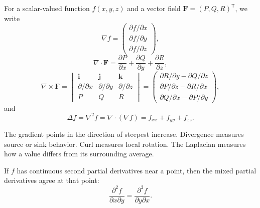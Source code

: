     \begin{definition}
        For a scalar-valued function $f(x,y,z)$ and a vector field
        $\mathbf{F}=(P,Q,R)^{\mathsf T}$, we write
        \[
            \nabla f
            =
            \begin{pmatrix}
                \partial f/\partial x\\
                \partial f/\partial y\\
                \partial f/\partial z
            \end{pmatrix},
        \]
        \[
            \nabla\cdot\mathbf{F}
            =
            \frac{\partial P}{\partial x}
            +
            \frac{\partial Q}{\partial y}
            +
            \frac{\partial R}{\partial z},
        \]
        \[
            \nabla\times\mathbf{F}
            =
            \begin{vmatrix}
                \mathbf{i} & \mathbf{j} & \mathbf{k} \\
                \partial/\partial x & \partial/\partial y & \partial/\partial z \\
                P & Q & R
            \end{vmatrix}
            =
            \begin{pmatrix}
                \partial R/\partial y-\partial Q/\partial z\\
                \partial P/\partial z-\partial R/\partial x\\
                \partial Q/\partial x-\partial P/\partial y
            \end{pmatrix},
        \]
        and
        \[
            \Delta f
            =
            \nabla^2f
            =
            \nabla\cdot(\nabla f)
            =
            f_{xx}+f_{yy}+f_{zz}.
        \]
    \end{definition}

    \begin{idea}
        The gradient points in the direction of steepest increase. Divergence
        measures source or sink behavior. Curl measures local rotation. The
        Laplacian measures how a value differs from its surrounding average.
    \end{idea}

    \begin{theorem}
        If $f$ has continuous second partial derivatives near a point, then the
        mixed partial derivatives agree at that point:
        \[
            \frac{\partial^2 f}{\partial x\partial y}
            =
            \frac{\partial^2 f}{\partial y\partial x}.
        \]
    \end{theorem}

